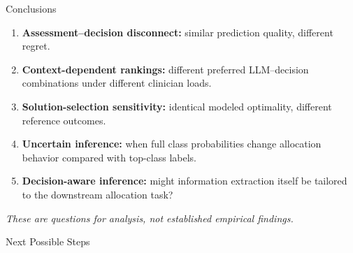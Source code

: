 \documentclass[aspectratio=169,11pt]{beamer}
\newcommand{\key}[1]{\textcolor{deepblue}{\textbf{#1}}}
\begin{document}
\begin{frame}{Conclusions}

\begin{enumerate}
\setlength{\itemsep}{10pt}

\item \key{Assessment--decision disconnect:} similar prediction quality, different regret.

\item \key{Context-dependent rankings:} different preferred LLM--decision combinations under different clinician loads.

\item \key{Solution-selection sensitivity:} identical modeled optimality, different reference outcomes.

\item \key{Uncertain inference:} when full class probabilities change allocation behavior compared with top-class labels.

\item \key{Decision-aware inference:} might information extraction itself be tailored to the downstream allocation task?

\end{enumerate}

\vspace{.1cm}

\small
\textit{These are questions for analysis, not established empirical findings.}

\end{frame}


\begin{frame}{Next Possible Steps}
    
\end{frame}
\end{document}
